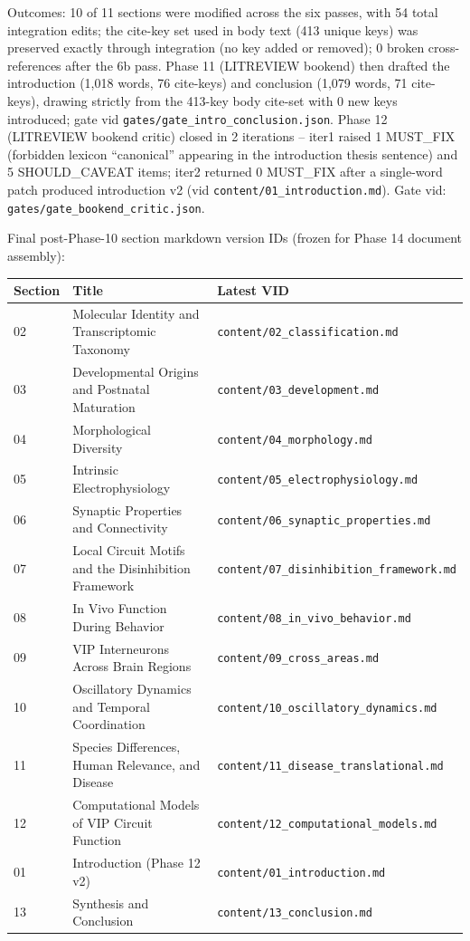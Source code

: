 \documentclass[11pt]{article}
\begin{document}
Outcomes: 10 of 11 sections were modified across the six passes, with 54 total integration edits; the cite-key set used in body text (413 unique keys) was preserved exactly through integration (no key added or removed); 0 broken cross-references after the 6b pass. Phase 11 (LITREVIEW bookend) then drafted the introduction (1,018 words, 76 cite-keys) and conclusion (1,079 words, 71 cite-keys), drawing strictly from the 413-key body cite-set with 0 new keys introduced; gate vid \texttt{gates/gate\_intro\_conclusion.json}. Phase 12 (LITREVIEW bookend critic) closed in 2 iterations -- iter1 raised 1 MUST\_FIX (forbidden lexicon ``canonical'' appearing in the introduction thesis sentence) and 5 SHOULD\_CAVEAT items; iter2 returned 0 MUST\_FIX after a single-word patch produced introduction v2 (vid \texttt{content/01\_introduction.md}). Gate vid: \texttt{gates/gate\_bookend\_critic.json}.

Final post-Phase-10 section markdown version IDs (frozen for Phase 14 document assembly):

\bigskip\noindent
\begin{tabular}{p{}p{}p{}}
\toprule
Section & Title & Latest VID \\
\hline
02 & Molecular Identity and Transcriptomic Taxonomy & \texttt{content/02\_classification.md} \\
03 & Developmental Origins and Postnatal Maturation & \texttt{content/03\_development.md} \\
04 & Morphological Diversity & \texttt{content/04\_morphology.md} \\
05 & Intrinsic Electrophysiology & \texttt{content/05\_electrophysiology.md} \\
06 & Synaptic Properties and Connectivity & \texttt{content/06\_synaptic\_properties.md} \\
07 & Local Circuit Motifs and the Disinhibition Framework & \texttt{content/07\_disinhibition\_framework.md} \\
08 & In Vivo Function During Behavior & \texttt{content/08\_in\_vivo\_behavior.md} \\
09 & VIP Interneurons Across Brain Regions & \texttt{content/09\_cross\_areas.md} \\
10 & Oscillatory Dynamics and Temporal Coordination & \texttt{content/10\_oscillatory\_dynamics.md} \\
11 & Species Differences, Human Relevance, and Disease & \texttt{content/11\_disease\_translational.md} \\
12 & Computational Models of VIP Circuit Function & \texttt{content/12\_computational\_models.md} \\
01 & Introduction (Phase 12 v2) & \texttt{content/01\_introduction.md} \\
13 & Synthesis and Conclusion & \texttt{content/13\_conclusion.md} \\
\bottomrule
\end{tabular}
\end{document}
